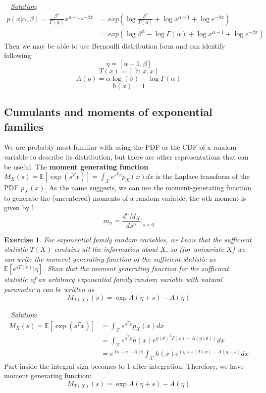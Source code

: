\documentclass[twoside]{article}
\newcounter{lecnum}
\newtheorem{exercise}{Exercise}[lecnum]
\newenvironment{solution}{
  \begin{flushleft} \noindent ~~\underline{\emph{Solution}}: \rmfamily}{\end{flushleft}}
\newcommand\E{\mathbb{E}}
\begin{document}
\begin{solution}
\begin{equation}
\begin{split}
p(x|\alpha,\beta) = \frac{\beta^\alpha}{\Gamma(\alpha)}x^{\alpha-1}e^{-\beta x} &= exp({\log{\frac{\beta^\alpha}{\Gamma(\alpha)}} + \log{x^{\alpha-1}} + \log{e^{-\beta x}}}) \\ 
&= exp({\log{\beta^\alpha}-\log{\Gamma(\alpha)} + \log{x^{\alpha-1}} + \log{e^{-\beta x}}})
\end{split}
\end{equation}
Then we may be able to use Bernoulli distribution form and can identify following: 
$$ \eta = [\alpha -1, \beta]  $$
$$ T(x) = [\ln x, x] $$
$$ A(\eta) = \alpha\log(\beta)-\log\Gamma(\alpha) $$ 
$$ h(x)=1 $$
\end{solution}

\subsection{Cumulants and moments of exponential families}

We are probably most familiar with using the PDF or the CDF of a random variable to describe its distribution, but there are other representations that can be useful. The \textbf{moment generating function} $M_X(s) = \E[\exp(s^Tx)] = \int_\mathcal{X} e^{s^Tx}p_X(x) dx$ is the Laplace transform of the PDF $p_X(x)$. As the name suggests, we can use the moment-generating function to generate the (uncentered) moments of a random variable; the $n$th moment is given by
\l
$$m_n = \frac{d^nM_X}{ds^n}\Bigr|_{s=0}$$

\begin{exercise}
  For exponential family random variables, we know that the sufficient statistic $T(X)$ contains all the information about $X$, so (for univariate $X$) we can write the moment generating function of the sufficient statistic as $\E[e^{sT(x)}|\eta]$. Show that the moment generating function for the sufficient statistic of  an arbitrary exponential family random variable with natural parameter $\eta$ can be written as
    $$M_{T(X)}(s) = \exp{A(\eta+s) - A(\eta)}$$
\end{exercise}

\begin{solution}
\begin{equation}
\begin{split}
M_X(s) = \E[\exp(s^Tx)] &= \int_\mathcal{X} e^{s^Tx}p_X(x) dx \\ 
&= \int_\mathcal{X} e^{s^Tx}h(x) e^{{\eta(\theta)^T T(x) - A(\eta(\theta))}} dx \\
&= e^{A{s+\eta}-A{(\eta})} \int_\mathcal{X} h(x) e^{{(\eta+s) T(x) - A(\eta+s)}} dx
\end{split}
\end{equation}
Part inside the integral sign becomes to 1 after integration. Therefore, we have moment generating function:
$$M_{T(X)}(s) = \exp{A(\eta+s) - A(\eta)}$$
\end{solution}
\end{document}
